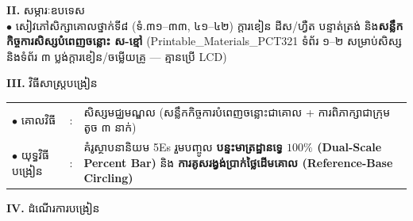 \documentclass[a4paper,10pt]{article}
\newcommand{\en}[1]{{\TimesEn #1}}
\begin{document}
{\vspace{2pt}

\textbf{II.} {\muol សម្ភារៈឧបទេស}\\[1pt]
\hspace*{0.55cm}$\bullet$ \hspace{0.35cm} សៀវភៅសិក្សាគោលថ្នាក់ទី៨ (ទំ.៣១–៣៣, ៤១–៤២) ក្ដារខៀន ដីស/ហ្វឺត បន្ទាត់ត្រង់ និង\textbf{សន្លឹកកិច្ចការសិស្សបំពេញចន្លោះ ស-ខ្មៅ} (\en{Printable\_Materials\_PCT321} ទំព័រ ១–២ សម្រាប់សិស្ស និងទំព័រ ៣ ប្លង់ក្ដារខៀន/ចម្លើយគ្រូ — គ្មានប្រើ \en{LCD})

\vspace{2pt}

\textbf{III.} {\muol វិធីសាស្រ្តបង្រៀន}\\[1pt]
\hspace*{0.45cm}%
\begin{tabular}{@{}l l L{14.85cm}@{}}
  $\bullet$ \hspace{0.25cm} គោលវិធី & : & សិស្សមជ្ឈមណ្ឌល (សន្លឹកកិច្ចការបំពេញចន្លោះជាគោល + ការពិភាក្សាជាក្រុមតូច ៣ នាក់) \\
  $\bullet$ \hspace{0.25cm} យុទ្ធវិធីបង្រៀន & : & គំរូស្ថាបនានិយម \en{5Es} រួមបញ្ចូល \textbf{បន្ទះមាត្រដ្ឋានទ្វេ $100\%$ (\en{Dual-Scale Percent Bar})} និង \textbf{ការគូសរង្វង់ប្រាក់ថ្លៃដើមគោល (\en{Reference-Base Circling})} \\
\end{tabular}
}

\vspace{2pt}

\textbf{IV.} {\muol ដំណើរការបង្រៀន}
\end{document}
